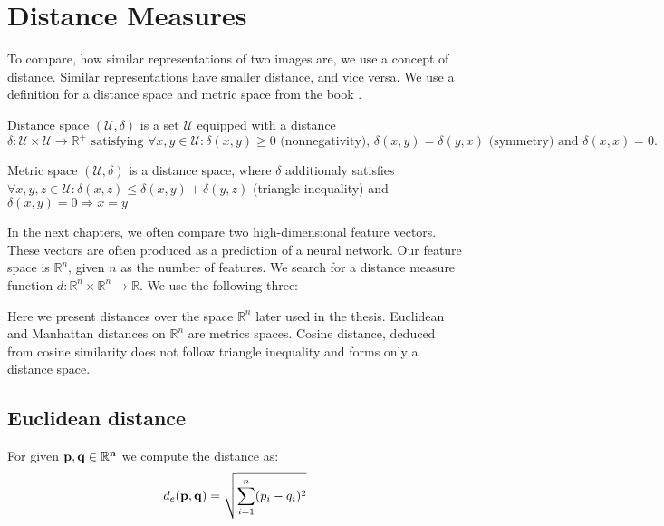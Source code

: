 \section{Distance Measures}

To compare, how similar representations of two images are, we use a concept of distance. Similar representations have smaller distance, and vice versa. We use a definition for a distance space and metric space from the book \cite{deza2009encyclopedia}.

\theoremstyle{definition}
\begin{definition}{Distance space}
$(\mathcal{U}, \delta )$ is a set $\mathcal{U}$ equipped
with a distance $\delta : \mathcal{U} \times \mathcal{U} \rightarrow \mathbb{R}^+ \text{ satisfying } \forall x, y \in \mathcal{U}: \delta(x, y) \geq 0 \text{ (nonnegativity), } \delta(x, y) = \delta(y, x) \text{ (symmetry) and } \delta(x, x) = 0.$
\end{definition}

\theoremstyle{definition}
\begin{definition}{Metric space}
$(\mathcal{U}, \delta)$ is a distance space, where $\delta$ additionaly satisfies $\forall x, y, z \in \mathcal{U} : \delta(x,z) \leq \delta(x,y) + \delta(y,z)$ (triangle inequality) and $\delta(x, y) = 0 \Rightarrow x = y$
\end{definition}

In the next chapters, we often compare two high-dimensional feature vectors. These vectors are often produced as a prediction of a neural network. Our feature space is $\mathbb{R}^n$, given $n$ as the number of features. We search for a distance measure function $d: \mathbb{R}^n \times \mathbb{R}^n \rightarrow \mathbb{R}$. We use the following three:

Here we present distances over the space $\mathbb{R}^n$ later used in the thesis. Euclidean and Manhattan distances on $\mathbb{R}^n$ are metrics spaces. Cosine distance, deduced from cosine similarity does not follow triangle inequality and forms only a distance space.

\subsection{Euclidean distance}

For given $\bf{p}, \bf{q} \in \mathbb{R}^n$ we compute the distance as:
\begin{equation}
d_e({\bf p},{\bf q}) = \sqrt{\sum_{i=1}^n (p_i - q_i)^2}    
\end{equation}


